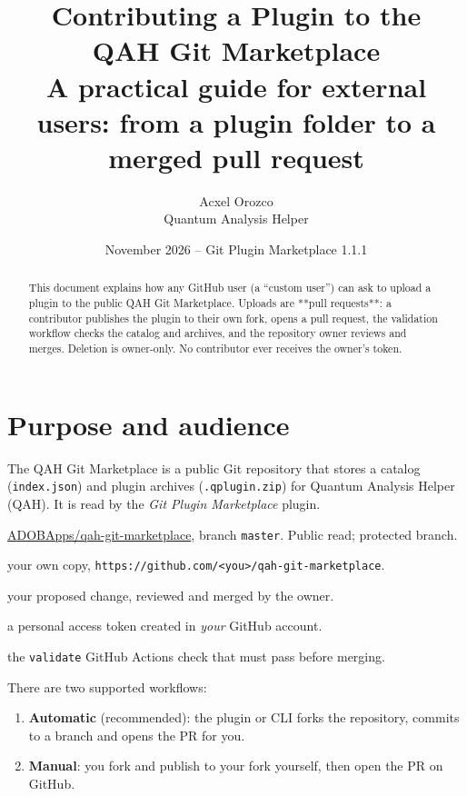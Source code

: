 \documentclass[11pt,a4paper]{article}
\title{\textbf{Contributing a Plugin to the\\QAH Git Marketplace}\\[0.4em]
\large A practical guide for external users: from a plugin folder to a merged pull request}
\author{Acxel Orozco\\Quantum Analysis Helper}
\date{November 2026 \quad -- \quad Git Plugin Marketplace 1.1.1}
\newcommand{\code}[1]{\texttt{#1}}
\newcommand{\repo}{\href{https://github.com/ADOBApps/qah-git-marketplace}{ADOBApps/qah-git-marketplace}}
\begin{document}
\maketitle
\thispagestyle{fancy}

\begin{abstract}
This document explains how any GitHub user (a ``custom user'') can ask to upload
a plugin to the public QAH Git Marketplace. Uploads are **pull requests**: a
contributor publishes the plugin to their own fork, opens a pull request, the
validation workflow checks the catalog and archives, and the repository owner
reviews and merges. Deletion is owner-only. No contributor ever receives the
owner's token.
\end{abstract}

\tableofcontents
\newpage

\section{Purpose and audience}

The QAH Git Marketplace is a public Git repository that stores a catalog
(\code{index.json}) and plugin archives (\code{.qplugin.zip}) for Quantum
Analysis Helper (QAH). It is read by the \emph{Git Plugin Marketplace} plugin.

\begin{description}[leftmargin=1.5em,style=nextline]
  \item[Upstream] \repo, branch \code{master}. Public read; protected branch.
  \item[Fork] your own copy, \code{https://github.com/<you>/qah-git-marketplace}.
  \item[Pull request (PR)] your proposed change, reviewed and merged by the owner.
  \item[Token] a personal access token created in \emph{your} GitHub account.
  \item[CI] the \code{validate} GitHub Actions check that must pass before merging.
\end{description}

There are two supported workflows:

\begin{enumerate}[leftmargin=1.5em]
  \item \textbf{Automatic} (recommended): the plugin or CLI forks the repository,
        commits to a branch and opens the PR for you.
  \item \textbf{Manual}: you fork and publish to your fork yourself, then open
        the PR on GitHub.
\end{enumerate}
\end{document}
